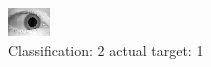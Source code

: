 \begin{figure}[h!]
\begin{center}
\includegraphics[width=0.60\columnwidth]{figures/ID1516_class_2_target_1.png}
\end{center}
\caption{ Classification: 2 actual target: 1}
\label{fig:ID1516_class_2_target_1}
\end{figure}
